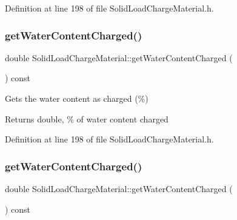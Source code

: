 Definition at line 198 of file Solid\+Load\+Charge\+Material.\+h.

\mbox{\label{class_solid_load_charge_material_a2f99a8553d12b45bad53acc14338199a}} 
\subsubsection{\texorpdfstring{get\+Water\+Content\+Charged()}{getWaterContentCharged()}\hspace{0.1cm}{\footnotesize\ttfamily [2/3]}}
{\footnotesize\ttfamily double Solid\+Load\+Charge\+Material\+::get\+Water\+Content\+Charged (\begin{DoxyParamCaption}{ }\end{DoxyParamCaption}) const\hspace{0.3cm}{\ttfamily [inline]}}

Gets the water content as charged (\%) \begin{DoxyReturn}{Returns}
double, \% of water content charged 
\end{DoxyReturn}


Definition at line 198 of file Solid\+Load\+Charge\+Material.\+h.

\mbox{\label{class_solid_load_charge_material_a2f99a8553d12b45bad53acc14338199a}} 
\subsubsection{\texorpdfstring{get\+Water\+Content\+Charged()}{getWaterContentCharged()}\hspace{0.1cm}{\footnotesize\ttfamily [3/3]}}
{\footnotesize\ttfamily double Solid\+Load\+Charge\+Material\+::get\+Water\+Content\+Charged (\begin{DoxyParamCaption}{ }\end{DoxyParamCaption}) const\hspace{0.3cm}{\ttfamily [inline]}}

